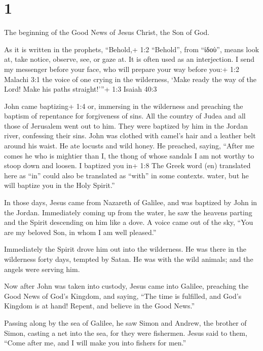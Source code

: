 \hypertarget{section}{%
\section{1}\label{section}}

 The beginning of the Good News of Jesus Christ, the Son of
God.

 As it is written in the prophets, ``Behold,+ 1:2
``Behold'', from ``ἰδοὺ'', means look at, take notice, observe, see, or
gaze at. It is often used as an interjection. I send my messenger before
your face, who will prepare your way before you:+ 1:2 Malachi 3:1
 the voice of one crying in the wilderness, `Make ready the
way of the Lord! Make his paths straight!'''+ 1:3 Isaiah 40:3

 John came baptizing+ 1:4 or, immersing in the wilderness
and preaching the baptism of repentance for forgiveness of sins.
 All the country of Judea and all those of Jerusalem went
out to him. They were baptized by him in the Jordan river, confessing
their sins.  John was clothed with camel's hair and a
leather belt around his waist. He ate locusts and wild honey.
 He preached, saying, ``After me comes he who is mightier
than I, the thong of whose sandals I am not worthy to stoop down and
loosen.  I baptized you in+ 1:8 The Greek word (en)
translated here as ``in'' could also be translated as ``with'' in some
contexts. water, but he will baptize you in the Holy Spirit.''

 In those days, Jesus came from Nazareth of Galilee, and was
baptized by John in the Jordan.  Immediately coming up from
the water, he saw the heavens parting and the Spirit descending on him
like a dove.  A voice came out of the sky, ``You are my
beloved Son, in whom I am well pleased.''

 Immediately the Spirit drove him out into the wilderness.
 He was there in the wilderness forty days, tempted by
Satan. He was with the wild animals; and the angels were serving him.

 Now after John was taken into custody, Jesus came into
Galilee, preaching the Good News of God's Kingdom,  and
saying, ``The time is fulfilled, and God's Kingdom is at hand! Repent,
and believe in the Good News.''

 Passing along by the sea of Galilee, he saw Simon and
Andrew, the brother of Simon, casting a net into the sea, for they were
fishermen.  Jesus said to them, ``Come after me, and I will
make you into fishers for men.''

